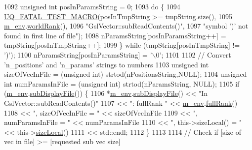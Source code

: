 \begin{DoxyCode}
1092     \textcolor{keywordtype}{unsigned} \textcolor{keywordtype}{int} posInParamsString = 0;
1093     \textcolor{keywordflow}{do} \{
1094       \hyperlink{_defines_8h_a56d63d18d0a6d45757de47fcc06f574d}{UQ\_FATAL\_TEST\_MACRO}(posInTmpString >= tmpString.size(),
1095                           \hyperlink{class_q_u_e_s_o_1_1_vector_ae7615172bb1e54339151d3f3d71a0344}{m\_env}.\hyperlink{class_q_u_e_s_o_1_1_base_environment_a78b57112bbd0e6dd0e8afec00b40ffa7}{worldRank}(),
1096                           \textcolor{stringliteral}{"GslVector::subReadContents()"},
1097                           \textcolor{stringliteral}{"symbol ')' not found in first line of file"});
1098       nParamsString[posInParamsString++] = tmpString[posInTmpString++];
1099     \} \textcolor{keywordflow}{while} (tmpString[posInTmpString] != \textcolor{charliteral}{')'});
1100     nParamsString[posInParamsString] = \textcolor{charliteral}{'\(\backslash\)0'};
1101 
1102     \textcolor{comment}{// Convert 'n\_positions' and 'n\_params' strings to numbers}
1103     \textcolor{keywordtype}{unsigned} \textcolor{keywordtype}{int} sizeOfVecInFile = (\textcolor{keywordtype}{unsigned} int) strtod(nPositionsString,NULL);
1104     \textcolor{keywordtype}{unsigned} \textcolor{keywordtype}{int} numParamsInFile = (\textcolor{keywordtype}{unsigned} int) strtod(nParamsString,   NULL);
1105     \textcolor{keywordflow}{if} (\hyperlink{class_q_u_e_s_o_1_1_vector_ae7615172bb1e54339151d3f3d71a0344}{m\_env}.\hyperlink{class_q_u_e_s_o_1_1_base_environment_a8a0064746ae8dddfece4229b9ad374d6}{subDisplayFile}()) \{
1106       *\hyperlink{class_q_u_e_s_o_1_1_vector_ae7615172bb1e54339151d3f3d71a0344}{m\_env}.\hyperlink{class_q_u_e_s_o_1_1_base_environment_a8a0064746ae8dddfece4229b9ad374d6}{subDisplayFile}() << \textcolor{stringliteral}{"In GslVector::subReadContents()"}
1107                               << \textcolor{stringliteral}{": fullRank "}            << \hyperlink{class_q_u_e_s_o_1_1_vector_ae7615172bb1e54339151d3f3d71a0344}{m\_env}.\hyperlink{class_q_u_e_s_o_1_1_base_environment_a84a239e42ae443cf71db6e03e8159620}{fullRank}()
1108                               << \textcolor{stringliteral}{", sizeOfVecInFile = "}   << sizeOfVecInFile
1109                               << \textcolor{stringliteral}{", numParamsInFile = "}   << numParamsInFile
1110                               << \textcolor{stringliteral}{", this->sizeLocal() = "} << this->\hyperlink{class_q_u_e_s_o_1_1_gsl_vector_ace6fb1739b7cf6456b3dcde84c766fb3}{sizeLocal}()
1111                               << std::endl;
1112     \}
1113 
1114     \textcolor{comment}{// Check if [size of vec in file] >= [requested sub vec size]}

\end{DoxyCode}
